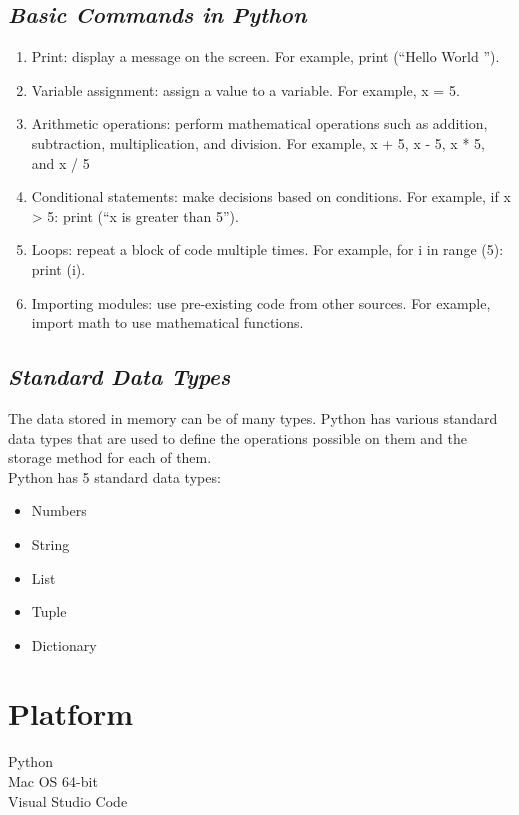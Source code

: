 \documentclass{article}
\begin{document}
\subsection{\textbf{\textit{Basic Commands in Python}}}
\begin{enumerate}
    \item Print: display a message on the screen. For example, print (``Hello World '').
    \item Variable assignment: assign a value to a variable. For example, x = 5.
    \item Arithmetic operations: perform mathematical operations such as addition, subtraction, multiplication, and division. For example, x + 5, x - 5, x * 5, and x / 5
    \item Conditional statements: make decisions based on conditions. For example, if x > 5: print (``x is greater than 5'').
    \item Loops: repeat a block of code multiple times. For example, for i in range (5): print (i).
    \item Importing modules: use pre-existing code from other sources. For example, import math to use mathematical functions.
\end{enumerate}
\subsection{\textbf{\textit{Standard Data Types}}}
The data stored in memory can be of many types. Python has various standard data types
that are used to define the operations possible on them and the storage method for each of
them.\\
Python has 5 standard data types:
\begin{itemize}
    \item Numbers
    \item String
    \item List 
    \item Tuple 
    \item Dictionary
\end{itemize}
\section{\textbf{Platform}}
Python\\
Mac OS 64-bit\\
Visual Studio Code
\end{document}

